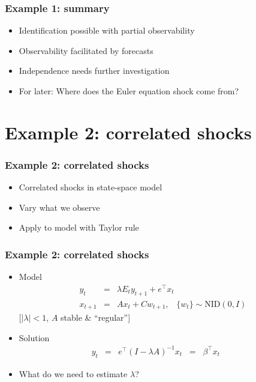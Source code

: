 \documentclass{beamer}
\begin{document}
\begin{frame}
\frametitle{Example 1:  summary}
\begin{itemize} \itemsep=\bigskipamount
\item Identification possible with partial observability
\item Observability facilitated by forecasts
\item Independence needs further investigation
\item For later:  Where does the Euler equation shock come from?
\end{itemize}
\end{frame}

\section{Example 2: correlated shocks}
\begin{frame}
\frametitle{Example 2:  correlated shocks}
\begin{itemize} \itemsep=\bigskipamount
\item Correlated shocks in state-space model
\item Vary what we observe
\item Apply to model with Taylor rule
\end{itemize}
\end{frame}

\begin{frame}
\frametitle{Example 2:  correlated shocks}
\begin{itemize} \itemsep=\bigskipamount
\item Model
\begin{eqnarray*}
    y_t &=& \lambda E_t y_{t+1} + e^\top x_t  \\
    x_{t+1} &=& A x_{t} + C w_{t+1},
            \;\;\;\{ w_t \} \sim \mbox{NID}(0,I)
\end{eqnarray*}
[$|\lambda|<1$, $A$ stable \& ``regular'']
\item Solution %
\begin{eqnarray*}
    y_t &=&  e^\top (I-\lambda A)^{-1} x_t \;\;=\;\; \beta^\top x_t
        \phantom{xxx}
\end{eqnarray*}
\item What do we need to estimate $\lambda$? %
\end{itemize}
\end{frame}
\end{document}

